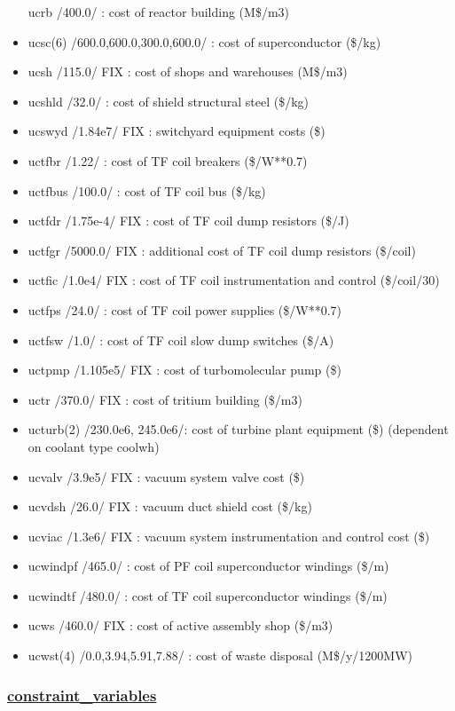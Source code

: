 \documentclass[]{article}
\begin{document}
\begin{itemize}
  ucrb /400.0/ : cost of reactor building (M\$/m3)
\item
  ucsc(6) /600.0,600.0,300.0,600.0/ : cost of superconductor (\$/kg)
\item
  ucsh /115.0/ FIX : cost of shops and warehouses (M\$/m3)
\item
  ucshld /32.0/ : cost of shield structural steel (\$/kg)
\item
  ucswyd /1.84e7/ FIX : switchyard equipment costs (\$)
\item
  uctfbr /1.22/ : cost of TF coil breakers (\$/W**0.7)
\item
  uctfbus /100.0/ : cost of TF coil bus (\$/kg)
\item
  uctfdr /1.75e-4/ FIX : cost of TF coil dump resistors (\$/J)
\item
  uctfgr /5000.0/ FIX : additional cost of TF coil dump resistors
  (\$/coil)
\item
  uctfic /1.0e4/ FIX : cost of TF coil instrumentation and control
  (\$/coil/30)
\item
  uctfps /24.0/ : cost of TF coil power supplies (\$/W**0.7)
\item
  uctfsw /1.0/ : cost of TF coil slow dump switches (\$/A)
\item
  uctpmp /1.105e5/ FIX : cost of turbomolecular pump (\$)
\item
  uctr /370.0/ FIX : cost of tritium building (\$/m3)
\item
  ucturb(2) /230.0e6, 245.0e6/: cost of turbine plant equipment (\$)
  (dependent on coolant type coolwh)
\item
  ucvalv /3.9e5/ FIX : vacuum system valve cost (\$)
\item
  ucvdsh /26.0/ FIX : vacuum duct shield cost (\$/kg)
\item
  ucviac /1.3e6/ FIX : vacuum system instrumentation and control cost
  (\$)
\item
  ucwindpf /465.0/ : cost of PF coil superconductor windings (\$/m)
\item
  ucwindtf /480.0/ : cost of TF coil superconductor windings (\$/m)
\item
  ucws /460.0/ FIX : cost of active assembly shop (\$/m3)
\item
  ucwst(4) /0.0,3.94,5.91,7.88/ : cost of waste disposal (M\$/y/1200MW)
\end{itemize}

\subsubsection{\texorpdfstring{\href{constraint_variables.html}{constraint\_variables}}{constraint\_variables}}\label{constraint_variables}
\end{document}
